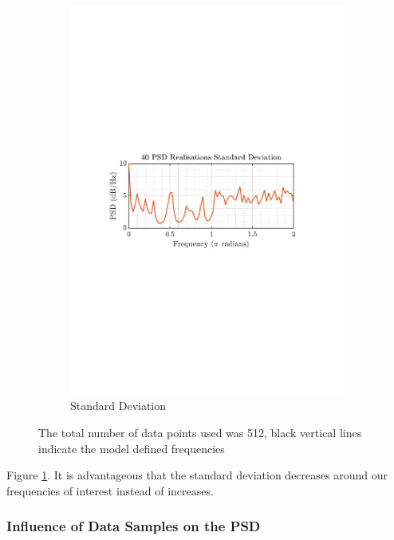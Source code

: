 \documentclass[12pt]{article}
\begin{document}
\begin{figure}[H]
\begin{subfigure}{0.49\textwidth}
			\includegraphics[trim={2.2cm 11.2cm 3.15cm  11.2cm}, clip, width=\textwidth]{../MATLAB/figures/q1_3c_fig02.pdf} 
			\captionsetup{justification=centering}
			\caption{Standard Deviation}
		\end{subfigure}
		\captionsetup{justification=centering}
		\caption{The total number of data points used was 512, black vertical lines indicate the model defined frequencies}
		\label{fig: 1-3c}
	\end{figure}

	Figure \ref{fig: 1-3c}. It is advantageous that the standard deviation decreases around our frequencies of interest instead of increases. 

	\subsubsection{Influence of Data Samples on the PSD}
	
\end{document}
